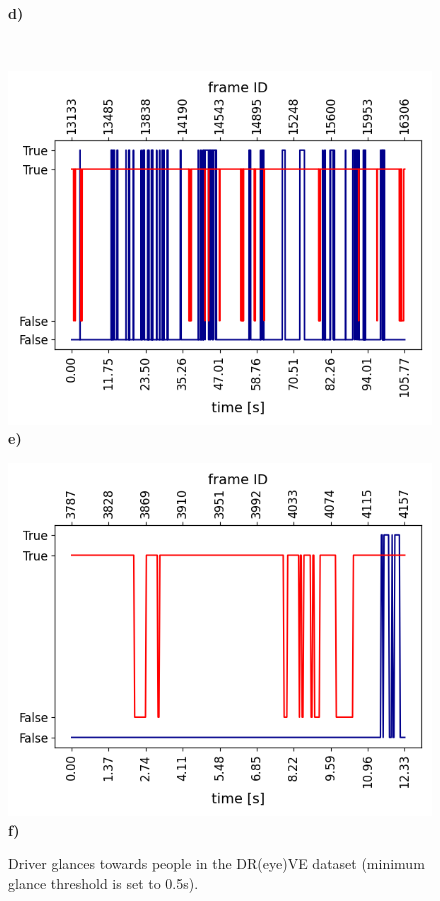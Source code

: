 \begin{figure}
\begin{minipage}{0.5\textwidth}
        \textbf{d)}
    \end{minipage}\hfill\\\vspace{0.2cm}
    \begin{minipage}{0.5\textwidth}
        \centering
        \includegraphics[width=\textwidth]{images/dreyeve/gazes/5.png}
        \textbf{e)}
    \end{minipage}\hfill
    \begin{minipage}{0.5\textwidth}
        \centering
        \includegraphics[width=\textwidth]{images/dreyeve/gazes/6.png}
        \textbf{f)}
    \end{minipage}
    \caption[Driver glances towards people in the DR(eye)VE dataset.]
    {Driver glances towards people in the DR(eye)VE dataset 
    (minimum glance threshold is set to 0.5s).}
    \label{fig:glances}
\end{figure}

